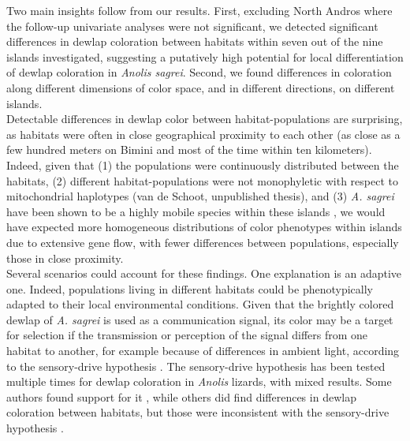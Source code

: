 Two main insights follow from our results. First, excluding North Andros where the follow-up univariate analyses were not significant, we detected significant differences in dewlap coloration between habitats within seven out of the nine islands investigated, suggesting a putatively high potential for local differentiation of dewlap coloration in \textit{Anolis sagrei}. Second, we found differences in coloration along different dimensions of color space, and in different directions, on different islands.\\

Detectable differences in dewlap color between habitat-populations are surprising, as habitats were often in close geographical proximity to each other (as close as a few hundred meters on Bimini and most of the time within ten kilometers). Indeed, given that (1) the populations were continuously distributed between the habitats, (2) different habitat-populations were not monophyletic with respect to mitochondrial haplotypes (van de Schoot, unpublished thesis), and (3) \textit{A. sagrei} have been shown to be a highly mobile species within these islands \citep{Kamath2018}, we would have expected more homogeneous distributions of color phenotypes within islands due to extensive gene flow, with fewer differences between populations, especially those in close proximity.\\

Several scenarios could account for these findings. One explanation is an adaptive one. Indeed, populations living in different habitats could be phenotypically adapted to their local environmental conditions. Given that the brightly colored dewlap of \textit{A. sagrei} is used as a communication signal, its color may be a target for selection if the transmission or perception of the signal differs from one habitat to another, for example because of differences in ambient light, according to the sensory-drive hypothesis \citep{Endler1988, Endler1992, Endler1998}. The sensory-drive hypothesis has been tested multiple times for dewlap coloration in \textit{Anolis} lizards, with mixed results. Some authors found support for it \citep{Leal2002, Leal2004}, while others did find differences in dewlap coloration between habitats, but those were inconsistent with the sensory-drive hypothesis \citep{Fleishman2009, Ng2012}.\\


